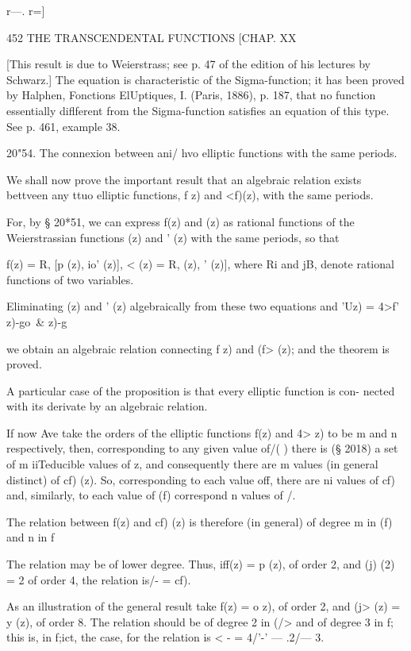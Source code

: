 {r—. r=]

452 THE TRANSCENDENTAL FUNCTIONS [CHAP. XX

[This result is due to Weierstrass; see p. 47 of the edition of his
lectures by Schwarz.] The equation is characteristic of the
Sigma-function; it has been proved by Halphen, Fonctions ElUptiques,
I. (Paris, 1886), p. 187, that no function essentially diflferent from
the Sigma-function satisfies an equation of this type. See p. 461,
example 38.

20"54. The connexion between ani/ hvo elliptic functions with the same
periods.

We shall now prove the important result that an algebraic relation
exists bettveen any ttuo elliptic functions, f z) and <f)(z), with the
same periods.

For, by § 20*51, we can express f(z) and (z) as rational functions of
the Weierstrassian functions (z) and ' (z) with the same periods, so
that

f(z) = R, [p (z), io' (z)], < (z) = R, (z), ' (z)], where Ri and jB,
denote rational functions of two variables.

Eliminating (z) and ' (z) algebraically from these two equations and
'Uz) = 4>f' z)-go\ \& z)-g

we obtain an algebraic relation connecting f z) and (f> (z); and the
theorem is proved.

A particular case of the proposition is that every elliptic function
is con- nected with its derivate by an algebraic relation.

If now Ave take the orders of the elliptic functions f(z) and 4> z) to
be m and n respectively, then, corresponding to any given value of/( )
there is (§ 2018) a set of m iiTeducible values of z, and consequently
there are m values (in general distinct) of cf) (z). So, corresponding
to each value off, there are ni values of cf) and, similarly, to each
value of (f) correspond n values of /.

The relation between f(z) and cf) (z) is therefore (in general) of
degree m in (f) and n in f

The relation may be of lower degree. Thus, iff(z) = p (z), of order 2,
and (j) (2) = 2 of order 4, the relation is/- = cf).

As an illustration of the general result take f(z) = o z), of order 2,
and (j> (z) = y (z), of order 8. The relation should be of degree 2 in
(/> and of degree 3 in f; this is, in f;ict, the case, for the
relation is < - = 4/'-' — .2/— 3.

}

